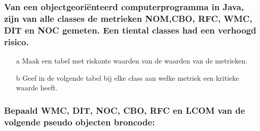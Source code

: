 \documentclass[a4paper,titlepage]{artikel1}
\begin{document}
   \subsubsection[Opdracht 1]{Van een objectgeori\"{e}nteerd computerprogramma in Java, zijn van alle classes de metrieken NOM,CBO, RFC, WMC, DIT en NOC gemeten. Een tiental classes had een verhoogd risico.}
   \begin{itemize}
     \item[a] Maak een tabel met riskante waarden van de waarden van de metrieken.
     \item[b] Geef in de volgende tabel bij elke class aan welke metriek een kritieke waarde heeft.
   \end{itemize}
   
   \subsubsection[Opdracht 2]{Bepaald WMC, DIT, NOC, CBO, RFC en LCOM van de volgende pseudo objecten broncode:}
\end{document}
